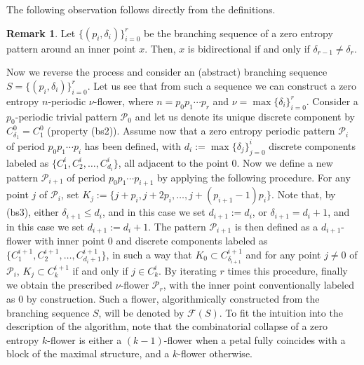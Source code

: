 \documentclass[a4paper]{amsart}
\theoremstyle{definition}
\newtheorem{remark}[theorem]{Remark}
\begin{document}
The following observation follows directly from the definitions.

\begin{remark}\label{bidi}
Let $\{(p_i,\delta_i)\}_{i=0}^r$ be the branching sequence of a zero entropy pattern around an inner point $x$. Then, $x$ is bidirectional if and only if $\delta_{r-1}\ne\delta_r$.
\end{remark}

%
%
Now we reverse the process and consider an (abstract) branching sequence $S=\{(p_i,\delta_i)\}_{i=0}^r$. Let us see that from such a sequence we can construct a zero entropy $n$-periodic $\nu$-flower, where $n=p_0p_1\cdots p_r$ and $\nu=\max\{\delta_i\}_{i=0}^r$. Consider a $p_0$-periodic trivial pattern $\mathcal{P}_0$ and let us denote its unique discrete component by $C^0_{\delta_1}=C^0_1$ (property (bs2)). Assume now that a zero entropy periodic pattern $\mathcal{P}_i$ of period $p_0p_1\cdots p_i$ has been defined, with $d_i:=\max\{\delta_j\}_{j=0}^i$ discrete components labeled as $\{C^i_1,C^i_2,\ldots,C^i_{d_i}\}$, all adjacent to the point 0. Now we define a new pattern $\mathcal{P}_{i+1}$ of period $p_0p_1\cdots p_{i+1}$ by applying the following procedure. For any point $j$ of $\mathcal{P}_i$, set $K_j:=\{j+p_i,j+2p_i,\ldots,j+(p_{i+1}-1)p_i\}$. Note that, by (bs3), either $\delta_{i+1}\le d_i$, and in this case we set $d_{i+1}:=d_i$, or $\delta_{i+1}=d_i+1$, and in this case we set $d_{i+1}:=d_i+1$. The pattern $\mathcal{P}_{i+1}$ is then defined as a $d_{i+1}$-flower with inner point 0 and discrete components labeled as $\{C^{i+1}_1,C^{i+1}_2,\ldots,C^{i+1}_{d_i+1}\}$, in such a way that $K_0\subset C^{i+1}_{\delta_{i+1}}$ and for any point $j\ne 0$ of $\mathcal{P}_i$, $K_j\subset C^{i+1}_k$ if and only if $j\in C^i_k$. By iterating $r$ times this procedure, finally we obtain the prescribed $\nu$-flower $\mathcal{P}_r$, with the inner point conventionally labeled as 0 by construction. Such a flower, algorithmically constructed from the branching sequence $S$, will be denoted by $\mathcal{F}(S)$. To fit the intuition into the description of the algorithm, note that the combinatorial collapse of a zero entropy $k$-flower is either a $(k-1)$-flower when a petal fully coincides with a block of the maximal structure, and a $k$-flower otherwise.
\end{document}

